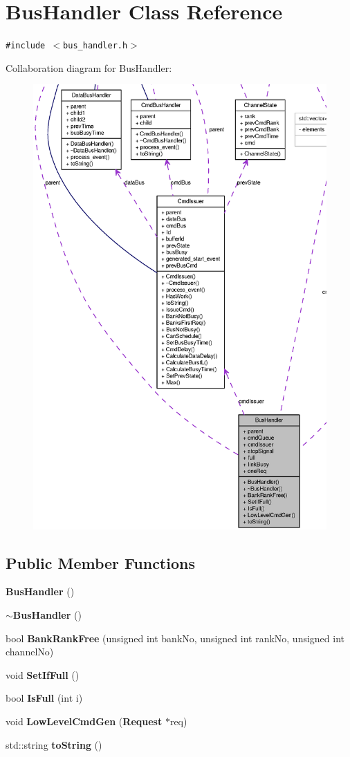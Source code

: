 \section{BusHandler Class Reference}
\label{classBusHandler}
{\tt \#include $<$bus\_\-handler.h$>$}

Collaboration diagram for BusHandler:\nopagebreak
\begin{figure}[H]
\begin{center}
\leavevmode
\includegraphics[width=400pt]{classBusHandler__coll__graph}
\end{center}
\end{figure}
\subsection*{Public Member Functions}
\begin{CompactItemize}
\item 
{\bf BusHandler} ()
\item 
{\bf $\sim$BusHandler} ()
\item 
bool {\bf BankRankFree} (unsigned int bankNo, unsigned int rankNo, unsigned int channelNo)
\item 
void {\bf SetIfFull} ()
\item 
bool {\bf IsFull} (int i)
\item 
void {\bf LowLevelCmdGen} ({\bf Request} $\ast$req)
\item 
std::string {\bf toString} ()
\end{CompactItemize}
